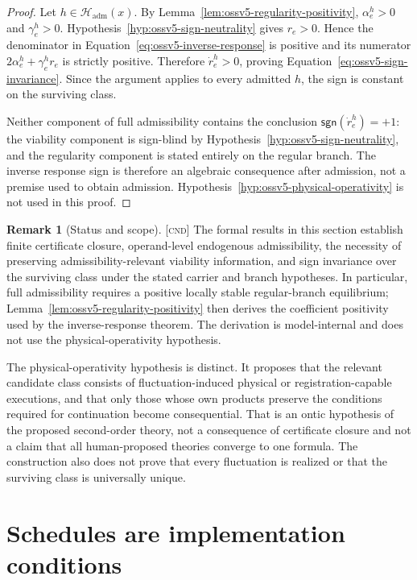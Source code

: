 \documentclass[11pt]{article}
\newcommand{\Cnd}{\textsc{[cnd]}}
\theoremstyle{definition}
\newtheorem{remark}[definition]{Remark}
\begin{document}
\begin{proof}
Let $h\in\mathcal H_{\mathrm{adm}}(x)$.  By
Lemma~\ref{lem:ossv5-regularity-positivity},
$\alpha_e^h>0$ and $\gamma_e^h>0$.  Hypothesis~\ref{hyp:ossv5-sign-neutrality}
gives $r_e>0$.  Hence the denominator in
Equation~\eqref{eq:ossv5-inverse-response} is positive and its numerator
$2\alpha_e^h+\gamma_e^h r_e$ is strictly positive.  Therefore
$\dot r_e^h>0$, proving Equation~\eqref{eq:ossv5-sign-invariance}.  Since the
argument applies to every admitted $h$, the sign is constant on the surviving
class.

Neither component of full admissibility contains the conclusion
$\mathsf{sgn}(\dot r_e^h)=+1$: the viability component is sign-blind by
Hypothesis~\ref{hyp:ossv5-sign-neutrality}, and the regularity component is
stated entirely on the regular branch.  The inverse response sign is therefore
an algebraic consequence after admission, not a premise used to obtain
admission.  Hypothesis~\ref{hyp:ossv5-physical-operativity} is not used in this
proof.
\end{proof}

\begin{remark}[Status and scope]
\label{rem:ossv5-status}
\Cnd{} The formal results in this section establish finite certificate closure,
operand-level endogenous admissibility, the necessity of preserving
admissibility-relevant viability information, and sign invariance over the
surviving class under the stated carrier and branch hypotheses.  In particular,
full admissibility requires a positive locally stable regular-branch equilibrium;
Lemma~\ref{lem:ossv5-regularity-positivity} then derives the coefficient
positivity used by the inverse-response theorem.  The derivation is
model-internal and does not use the physical-operativity hypothesis.

The physical-operativity hypothesis is distinct.  It proposes that the relevant
candidate class consists of fluctuation-induced physical or registration-capable
executions, and that only those whose own products preserve the conditions
required for continuation become consequential.  That is an ontic hypothesis of
the proposed second-order theory, not a consequence of certificate closure and
not a claim that all human-proposed theories converge to one formula.  The
construction also does not prove that every fluctuation is realized or that the
surviving class is universally unique.
\end{remark}

\section{Schedules are implementation conditions}
\label{sec:schedules}
\end{document}
